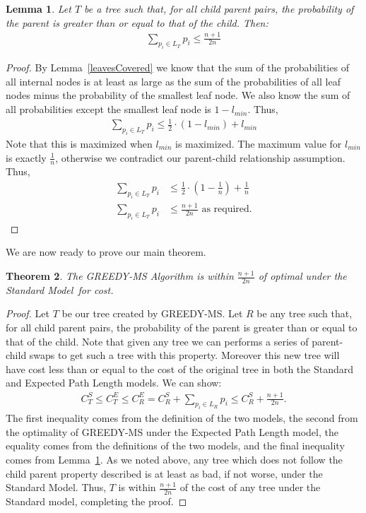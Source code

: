 \documentclass[letterpaper,12pt,titlepage,oneside,final]{book}
\theoremstyle{plain}
\newtheorem{thm}{Theorem}[section]
\newtheorem{lem}[thm]{Lemma}
\begin{document}
\begin{lem}\label{leavesHalf}
Let $T$ be a tree such that, for all child parent pairs, the probability of the parent is greater than or equal to that of the child. Then:
\begin{align*}
\sum_{p_i \in L_T} p_i \leq \frac{n+1}{2n}
\end{align*}
\end{lem}
\begin{proof}
By Lemma~\ref{leavesCovered} we know that the sum of the probabilities of all internal nodes is at least as large as the sum of the probabilities of all leaf nodes minus the probability of the smallest leaf node. We also know the sum of all probabilities except the smallest leaf node is $1-l_{min}$. Thus, 
\begin{align*}
\sum_{p_i \in L_T} p_i \leq \frac{1}{2} \cdot (1-l_{min}) + l_{min}
\end{align*}
\noindent Note that this is maximized when $l_{min}$ is maximized. The maximum value for $l_{min}$ is exactly $\frac{1}{n}$, otherwise we contradict our parent-child relationship assumption. Thus,
\begin{align*}
\sum_{p_i \in L_T} p_i &\leq \frac{1}{2} \cdot (1-\frac{1}{n}) + \frac{1}{n} \\
\sum_{p_i \in L_T} p_i &\leq \frac{n+1}{2n} \text{ as required.}
\end{align*}
\end{proof}


We are now ready to prove our main theorem.

\begin{thm}
The GREEDY-MS Algorithm is within $\frac{n+1}{2n}$ of optimal under the Standard Model\ for cost.
\end{thm}

\begin{proof}
Let $T$ be our tree created by GREEDY-MS. Let $R$ be any tree such that, for all child parent pairs, the probability of the parent is greater than or equal to that of the child. Note that given any tree we can performs a series of parent-child swaps to get such a tree with this property. Moreover this new tree will have cost less than or equal to the cost of the original tree in both the Standard and Expected Path Length models. We can show:
\begin{align*}
C^S_T \leq C^E_T \leq C^E_R = C^S_R + \sum_{p_i \in L_R} p_i \leq C^S_R + \frac{n+1}{2n}.
\end{align*} 
The first inequality comes from the definition of the two models, the second from the optimality of GREEDY-MS under the Expected Path Length model, the equality comes from the definitions of the two models, and the final inequality comes from Lemma~\ref{leavesHalf}. As we noted above, any tree which does not follow the child parent property described is at least as bad, if not worse, under the Standard Model. Thus, $T$ is within $\frac{n+1}{2n}$ of the cost of any tree under the Standard model, completing the proof.

\end{proof}
\end{document}
